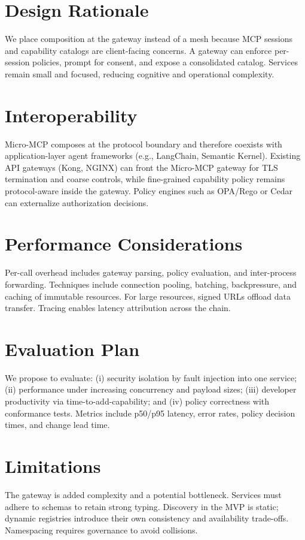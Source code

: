 \documentclass[conference]{IEEEtran}
\begin{document}
\section{Design Rationale}
We place composition at the gateway instead of a mesh because MCP sessions and capability catalogs are client-facing concerns. A gateway can enforce per-session policies, prompt for consent, and expose a consolidated catalog. Services remain small and focused, reducing cognitive and operational complexity.

\section{Interoperability}
Micro-MCP composes at the protocol boundary and therefore coexists with application-layer agent frameworks (e.g., LangChain\cite{langchain}, Semantic Kernel\cite{semantickernel}). Existing API gateways (Kong\cite{kong}, NGINX\cite{nginx}) can front the Micro-MCP gateway for TLS termination and coarse controls, while fine-grained capability policy remains protocol-aware inside the gateway. Policy engines such as OPA/Rego\cite{opa} or Cedar\cite{cedar} can externalize authorization decisions.

\section{Performance Considerations}
Per-call overhead includes gateway parsing, policy evaluation, and inter-process forwarding. Techniques include connection pooling, batching, backpressure, and caching of immutable resources. For large resources, signed URLs offload data transfer. Tracing enables latency attribution across the chain.

\section{Evaluation Plan}
We propose to evaluate: (i) security isolation by fault injection into one service; (ii) performance under increasing concurrency and payload sizes; (iii) developer productivity via time-to-add-capability; and (iv) policy correctness with conformance tests. Metrics include p50/p95 latency, error rates, policy decision times, and change lead time.

\section{Limitations}
The gateway is added complexity and a potential bottleneck. Services must adhere to schemas to retain strong typing. Discovery in the MVP is static; dynamic registries introduce their own consistency and availability trade-offs. Namespacing requires governance to avoid collisions.
\end{document}

